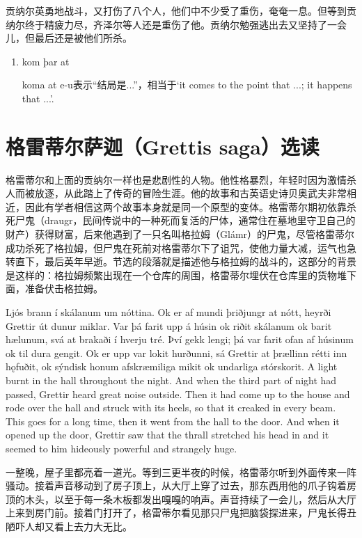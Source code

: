 \begin{translation*}{}
    贡纳尔英勇地战斗，又打伤了八个人，他们中不少受了重伤，奄奄一息。但等到贡纳尔终于精疲力尽，齐泽尔等人还是重伤了他。贡纳尔勉强逃出去又坚持了一会儿，但最后还是被他们所杀。
\end{translation*}
\begin{grammar*}{}
    \begin{enumerate}[leftmargin=*]
        \item kom þar at

              koma at e-u表示“结局是...”，相当于`it comes to the point that ...; it happens that ...'.
    \end{enumerate}
\end{grammar*}
\section{格雷蒂尔萨迦（Grettis saga）选读}
格雷蒂尔和上面的贡纳尔一样也是悲剧性的人物。他性格暴烈，年轻时因为激情杀人而被放逐，从此踏上了传奇的冒险生涯。他的故事和古英语史诗贝奥武夫非常相近，因此有学者相信这两个故事本身就是同一个原型的变体。格雷蒂尔期初依靠杀死尸鬼（draugr，民间传说中的一种死而复活的尸体，通常住在墓地里守卫自己的财产）获得财富，后来他遇到了一只名叫格拉姆（Glámr）的尸鬼，尽管格雷蒂尔成功杀死了格拉姆，但尸鬼在死前对格雷蒂尔下了诅咒，使他力量大减，运气也急转直下，最后英年早逝。节选的段落就是描述他与格拉姆的战斗的，这部分的背景是这样的：格拉姆频繁出现在一个仓库的周围，格雷蒂尔埋伏在仓库里的货物堆下面，准备伏击格拉姆。
\begin{paracol}{2}
    Ljós brann í skálanum um nóttina. Ok er af mundi þriðjungr at nótt, heyrði Grettir út dunur miklar. Var þá farit upp á húsin ok riðit skálanum ok barit hælunum, svá at brakaði í hverju tré. Því gekk lengi; þá var farit ofan af húsinum ok til dura gengit. Ok er upp var lokit hurðunni, sá Grettir at þrællinn rétti inn hǫfuðit, ok sýndisk honum afskræmiliga mikit ok undarliga stórskorit.
    \switchcolumn
    A light burnt in the hall throughout the night. And when the third part of night had passed, Grettir heard great noise outside. Then it had come up to the house and rode over the hall and struck with its heels, so that it creaked in every beam. This goes for a long time, then it went from the hall to the door. And when it opened up the door, Grettir saw that the thrall stretched his head in and it seemed to him hideously powerful and strangely huge.
\end{paracol}
\begin{translation*}{}
    一整晚，屋子里都亮着一道光。等到三更半夜的时候，格雷蒂尔听到外面传来一阵骚动。接着声音移动到了房子顶上，从大厅上穿了过去，那东西用他的爪子钩着房顶的木头，以至于每一条木板都发出嘎嘎的响声。声音持续了一会儿，然后从大厅上来到房门前。接着门打开了，格雷蒂尔看见那只尸鬼把脑袋探进来，尸鬼长得丑陋吓人却又看上去力大无比。
\end{translation*}
